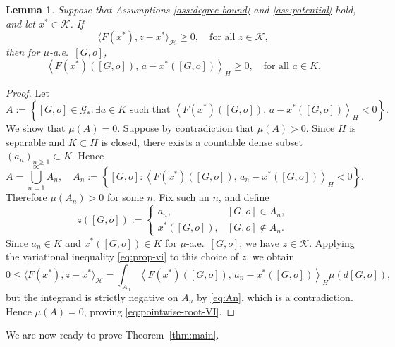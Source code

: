 \documentclass[11pt]{article}
\newcommand{\be}{\begin{equation}}
\newcommand{\ee}{\end{equation}}
\newtheorem{lemma}[theorem]{Lemma}
\numberwithin{equation}{section}
\begin{document}
\begin{lemma}\label{lemma:pointwise-VI}
Suppose that Assumptions \ref{ass:degree-bound} and \ref{ass:potential} hold, and let \(x^\ast\in\mathcal K\). If
\be\label{eq:prop-vi}
\langle F(x^\ast),z-x^\ast\rangle_{\mathcal H}\ge 0,
\quad \text{for all } z\in\mathcal K,
\ee
then for \(\mu\)-a.e.\ \([G,o]\),
\begin{equation} \label{eq:pointwise-root-VI}
\left\langle
F(x^\ast)([G,o]),\, a-x^\ast([G,o])
\right\rangle_H
\ge 0,
\quad \text{for all } a\in K.
\end{equation}
\end{lemma}

\begin{proof}
Let
\[
A:=
\left\{
[G,o]\in\mathcal G_\ast :
\exists a\in K \text{ such that }
\left\langle
F(x^\ast)([G,o]),\, a-x^\ast([G,o])
\right\rangle_H<0
\right\}.
\]
We show that \(\mu(A)=0\). Suppose by contradiction that \(\mu(A)>0\). Since \(H\) is separable and \(K\subset H\) is closed, there exists a countable dense subset \((a_n)_{n\ge 1}\subset K\). Hence
\be\label{eq:An}
A=\bigcup_{n=1}^\infty A_n,
\quad
A_n:=
\left\{
[G,o]:
\left\langle
F(x^\ast)([G,o]),\, a_n-x^\ast([G,o])
\right\rangle_H<0
\right\}.
\ee
Therefore \(\mu(A_n)>0\) for some \(n\). Fix such an \(n\), and define
\[
z([G,o]):=
\begin{cases}
a_n, & [G,o]\in A_n,\\
x^\ast([G,o]), & [G,o]\notin A_n.
\end{cases}
\]
Since \(a_n\in K\) and \(x^\ast([G,o])\in K\) for \(\mu\)-a.e.~$[G,o]$, we have \(z\in\mathcal K\). Applying the variational inequality \eqref{eq:prop-vi} to this choice of \(z\), we obtain
\[
0\le
\langle F(x^\ast),z-x^\ast\rangle_{\mathcal H}
=
\int_{A_n}
\left\langle
F(x^\ast)([G,o]),\, a_n-x^\ast([G,o])
\right\rangle_H
\mu(d[G,o]),
\]
but the integrand is strictly negative on \(A_n\) by \eqref{eq:An}, which is a contradiction. Hence \(\mu(A)=0\), proving \eqref{eq:pointwise-root-VI}.
\end{proof}

We are now ready to prove Theorem~\ref{thm:main}.
\end{document}
